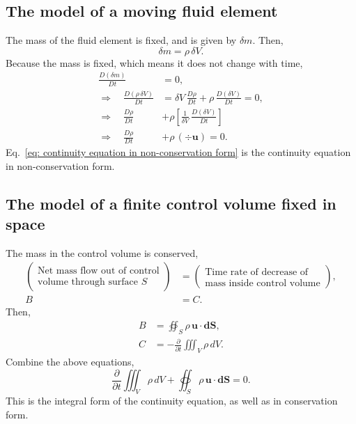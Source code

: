\subsection{The model of a moving fluid element}
The mass of the fluid element is fixed, and is given by $\delta m$. 
Then, 
\begin{equation}
    \delta m = \rho \, \delta V.
\end{equation}
Because the mass is fixed, which means it does not change with time, 
\begin{align}
    \frac{D(\delta m)}{Dt} &= 0, \\
    \Longrightarrow \quad 
    \frac{D(\rho\,\delta V)}{Dt} 
    &= \delta V\,\frac{D\rho}{Dt} 
    + \rho\, \frac{D(\delta V)}{Dt} = 0, \\
    \Longrightarrow \quad 
    \frac{D\rho}{Dt}
    &+ \rho \left[
        \frac{1}{\delta V}\, \frac{D(\delta V)}{Dt}
        \right] \\
    \Longrightarrow \quad 
    \frac{D\rho}{Dt}
    &+ \rho \,(\div \bm{u}) = 0.
    \label{eq: continuity equation in non-conservation form}
\end{align}
Eq.~\eqref{eq: continuity equation in non-conservation form} is the continuity equation in non-conservation form. 

\subsection{The model of a finite control volume fixed in space}
The mass in the control volume is conserved, 
\begin{equation}
\begin{aligned}
    \left(\substack{
        \text{Net mass flow out of control} \\
        \text{volume through surface }S}\right) 
        &= 
    \left(\substack{
        \text{Time rate of decrease of} \\
        \text{mass inside control volume}}\right), \\
    B &= C.
\end{aligned}
\end{equation}
Then, 
\begin{align}
    B &= \oiint_S \rho \, \bm{u} \cdot \bm{dS}, \\
    C &= -\frac{\partial}{\partial t} 
    \iiint_V \rho\, dV. 
\end{align}
Combine the above equations, 
\begin{equation}
    \frac{\partial}{\partial t} 
    \iiint_V \rho\, dV 
    + \oiint_S \rho \, \bm{u} \cdot \bm{dS} 
    = 0.
\end{equation}
This is the integral form of the continuity equation, as well as in conservation form.

